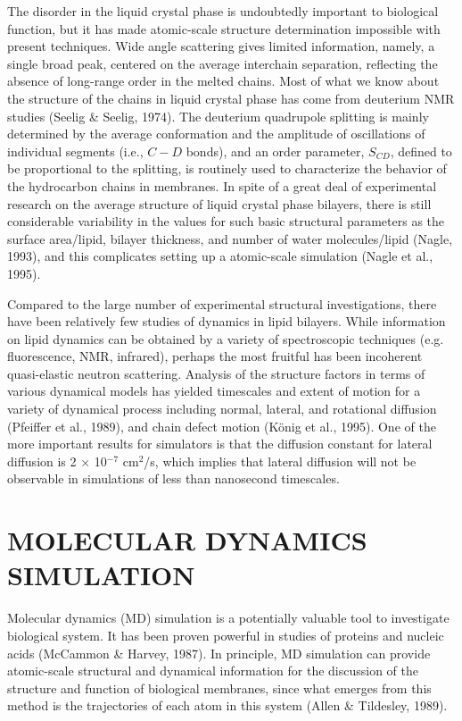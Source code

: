 The disorder in the liquid crystal phase is undoubtedly important to
biological function, but it has made atomic-scale
structure determination impossible with present techniques.
Wide angle scattering gives limited information, namely, a single
broad peak, centered on the average interchain separation,
reflecting the absence of long-range order in the melted chains.
Most of what we know about the structure of the chains in liquid
crystal phase has come from deuterium NMR studies (Seelig \& Seelig,
1974). 
The deuterium quadrupole splitting is mainly
determined by the average conformation and the amplitude of
oscillations of individual segments (i.e., $C-D$ bonds),
and an order parameter, $S_{CD}$, defined to be proportional to
the splitting, is routinely used to characterize the behavior
of the hydrocarbon chains in membranes. In spite of a great deal
of experimental research on the average structure of liquid
crystal phase bilayers, there is still considerable variability
in the values for such basic structural parameters as the surface
area/lipid, bilayer thickness, and number of water molecules/lipid
(Nagle, 1993),
and this complicates setting up a atomic-scale
simulation (Nagle et al., 1995).

Compared to the large number of experimental structural investigations,
there have been relatively few studies of dynamics in lipid bilayers.
While information on lipid dynamics can be obtained by a variety
of spectroscopic techniques (e.g. fluorescence, NMR, infrared),
perhaps the most fruitful has been incoherent quasi-elastic neutron
scattering.
Analysis of the structure factors in terms of various dynamical models
has yielded timescales and extent of motion for a variety of dynamical
process including normal, lateral, and rotational diffusion (Pfeiffer et
al., 1989),
and chain defect motion (K\"{o}nig et al., 1995).
One of the more important results for simulators is that the
diffusion constant for lateral diffusion is 2 $\times$ 10$^{-7}$
cm$^2$/s, which implies that lateral diffusion will not be observable
in simulations of less than nanosecond timescales.

\section{MOLECULAR DYNAMICS SIMULATION}

Molecular dynamics (MD) simulation is a potentially
valuable tool to investigate biological system.
It has been proven powerful in studies
of proteins and nucleic acids (McCammon \& Harvey, 1987).
In principle, MD simulation can provide
atomic-scale structural and dynamical information for the
discussion of the structure and function of biological membranes,
since what emerges from this method is the trajectories of each
atom in this system (Allen \& Tildesley, 1989).

